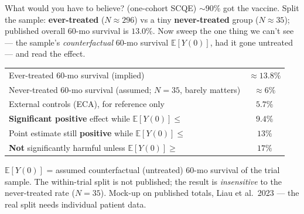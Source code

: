 \documentclass[xcolor=dvipsnames]{beamer}
\newcommand\YY{Y(0)}                    %
\newcommand\E{\mathbb{E}}
\begin{document}
\begin{frame}{What would you have to believe? \hfill\small(one-cohort SCQE)}
\scriptsize
$\sim$90\% got the vaccine. Split the sample: \textbf{ever-treated} ($N{\approx}296$)
vs a tiny \textbf{never-treated} group ($N{\approx}35$); published overall 60-mo
survival is $13.0\%$. Now sweep the one thing we can't see --- the sample's
\emph{counterfactual} 60-mo survival $\E[\YY]$, had it gone untreated --- and read the effect.
\begin{center}
\renewcommand{\arraystretch}{1.3}
\begin{tabular}{lc}
\hline
Ever-treated 60-mo survival (implied) & $\approx 13.8\%$\\
Never-treated 60-mo survival (assumed; $N{=}35$, barely matters) & $\approx 6\%$\\
External controls (ECA), for reference only & $5.7\%$\\
\hline
\textbf{Significant positive} effect while $\E[\YY]\le$ & $\mathbf{9.4\%}$\\
Point estimate still \textbf{positive} while $\E[\YY]\le$ & $13\%$\\
\textbf{Not} significantly harmful unless $\E[\YY]\ge$ & $17\%$\\
\hline
\end{tabular}
\end{center}
{\tiny $\E[\YY]$ = assumed counterfactual (untreated) 60-mo survival of the trial sample.
The within-trial split is not published; the result is \emph{insensitive} to the
never-treated rate ($N{=}35$). Mock-up on published totals, Liau et al.\ 2023 --- the
real split needs individual patient data.}
\end{frame}
\end{document}
